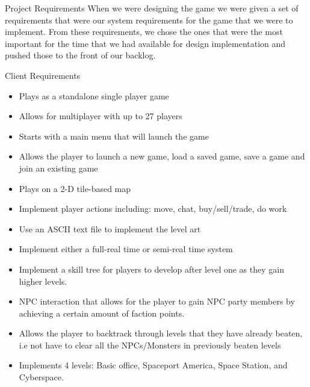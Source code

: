 \begin{chapter}{Project Requirements}
When we were designing the game we were given a set of requirements that were our system requirements for the game that we were to implement. From these requirements, we chose the ones that were the most important for the time that we had available for design implementation and pushed those to the front of our backlog.  

\begin{section}{Client Requirements}
	\begin{itemize}
		\item Plays as a standalone single player game
		\item Allows for multiplayer with up to 27 players
		\item Starts with a main menu that will launch the game
		\item Allows the player to launch a new game, load a saved game, save a game and join an existing game
		\item Plays on a 2-D tile-based map
		\item Implement player actions including: move, chat, buy/sell/trade, do work
		\item Use an ASCII text file to implement the level art
		\item Implement either a full-real time or semi-real time system
		\item Implement a skill tree for players to develop after level one as they gain higher levels.
		\item NPC interaction that allows for the player to gain NPC party members by achieving a certain amount of faction points.
		\item Allows the player to backtrack through levels that they have already beaten, i.e not have to clear all the NPCs/Monsters in previously beaten levels
		\item Implements 4 levels: Basic office, Spaceport America, Space Station, and Cyberspace.
	\end{itemize}
\end{section}


\end{chapter}

